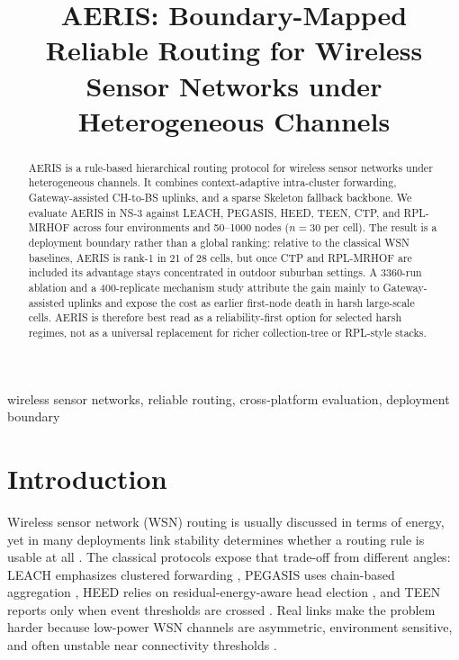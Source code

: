 \documentclass[conference]{IEEEtran}
\title{AERIS: Boundary-Mapped Reliable Routing for Wireless Sensor Networks under Heterogeneous Channels}
\author{
\IEEEauthorblockN{Kangrui Li, Junyi Lin, and Xiaobo Zhang}
\IEEEauthorblockA{Faculty of Automation, Guangdong University of Technology, Guangzhou 510006, China\\
\textit{Corresponding author:} Kangrui Li \texttt{1403073295@mails.gdut.edu.cn}}
}
\begin{document}
\maketitle

\begin{abstract}
AERIS is a rule-based hierarchical routing protocol for wireless sensor networks under heterogeneous channels. It combines context-adaptive intra-cluster forwarding, Gateway-assisted CH-to-BS uplinks, and a sparse Skeleton fallback backbone. We evaluate AERIS in NS-3 against LEACH, PEGASIS, HEED, TEEN, CTP, and RPL-MRHOF across four environments and 50--1000 nodes ($n=30$ per cell). The result is a deployment boundary rather than a global ranking: relative to the classical WSN baselines, AERIS is rank-1 in 21 of 28 cells, but once CTP and RPL-MRHOF are included its advantage stays concentrated in outdoor suburban settings. A 3360-run ablation and a 400-replicate mechanism study attribute the gain mainly to Gateway-assisted uplinks and expose the cost as earlier first-node death in harsh large-scale cells. AERIS is therefore best read as a reliability-first option for selected harsh regimes, not as a universal replacement for richer collection-tree or RPL-style stacks.
\end{abstract}

\begin{IEEEkeywords}
wireless sensor networks, reliable routing, cross-platform evaluation, deployment boundary
\end{IEEEkeywords}

\section{Introduction}
Wireless sensor network (WSN) routing is usually discussed in terms of energy, yet in many deployments link stability determines whether a routing rule is usable at all \cite{akyildiz2002survey,rault2014energy,kandris2009power}. The classical protocols expose that trade-off from different angles: LEACH emphasizes clustered forwarding \cite{heinzelman2000energy}, PEGASIS uses chain-based aggregation \cite{lindsey2002pegasis}, HEED relies on residual-energy-aware head election \cite{younis2004heed}, and TEEN reports only when event thresholds are crossed \cite{manjeshwar2001teen}. Real links make the problem harder because low-power WSN channels are asymmetric, environment sensitive, and often unstable near connectivity thresholds \cite{zuniga2004analyzing,zamalloa2007analysis,baccour2012radio}.
\end{document}
